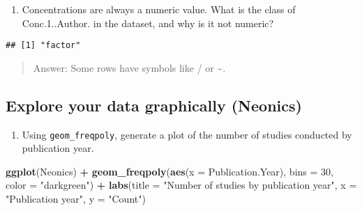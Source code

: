 \documentclass[
]{article}
\newenvironment{Shaded}{\begin{snugshade}}{\end{snugshade}}
\newcommand{\DataTypeTok}[1]{\textcolor[rgb]{0.13,0.29,0.53}{#1}}
\newcommand{\DecValTok}[1]{\textcolor[rgb]{0.00,0.00,0.81}{#1}}
\newcommand{\KeywordTok}[1]{\textcolor[rgb]{0.13,0.29,0.53}{\textbf{#1}}}
\newcommand{\NormalTok}[1]{#1}
\newcommand{\OperatorTok}[1]{\textcolor[rgb]{0.81,0.36,0.00}{\textbf{#1}}}
\newcommand{\StringTok}[1]{\textcolor[rgb]{0.31,0.60,0.02}{#1}}
\providecommand{\tightlist}{%
  \setlength{\itemsep}{0pt}\setlength{\parskip}{0pt}}
\begin{document}
\begin{enumerate}
\def\labelenumi{\arabic{enumi}.}
\setcounter{enumi}{7}
\tightlist
\item
  Concentrations are always a numeric value. What is the class of
  Conc.1..Author. in the dataset, and why is it not numeric?
\end{enumerate}

\begin{Shaded}
\end{Shaded}

\begin{verbatim}
## [1] "factor"
\end{verbatim}

\begin{quote}
Answer: Some rows have symbols like / or \textasciitilde.
\end{quote}

\hypertarget{explore-your-data-graphically-neonics}{%
\subsection{Explore your data graphically
(Neonics)}\label{explore-your-data-graphically-neonics}}

\begin{enumerate}
\def\labelenumi{\arabic{enumi}.}
\setcounter{enumi}{8}
\tightlist
\item
  Using \texttt{geom\_freqpoly}, generate a plot of the number of
  studies conducted by publication year.
\end{enumerate}

\begin{Shaded}
\begin{Highlighting}[]
\KeywordTok{ggplot}\NormalTok{(Neonics) }\OperatorTok{+}
\StringTok{  }\KeywordTok{geom_freqpoly}\NormalTok{(}\KeywordTok{aes}\NormalTok{(}\DataTypeTok{x =}\NormalTok{ Publication.Year), }\DataTypeTok{bins =} \DecValTok{30}\NormalTok{, }\DataTypeTok{color =} \StringTok{"darkgreen"}\NormalTok{) }\OperatorTok{+}
\StringTok{  }\KeywordTok{labs}\NormalTok{(}\DataTypeTok{title =} \StringTok{"Number of studies by publication year"}\NormalTok{, }\DataTypeTok{x =} \StringTok{"Publication year"}\NormalTok{, }\DataTypeTok{y =} \StringTok{"Count"}\NormalTok{)}
\end{Highlighting}
\end{Shaded}
\end{document}
